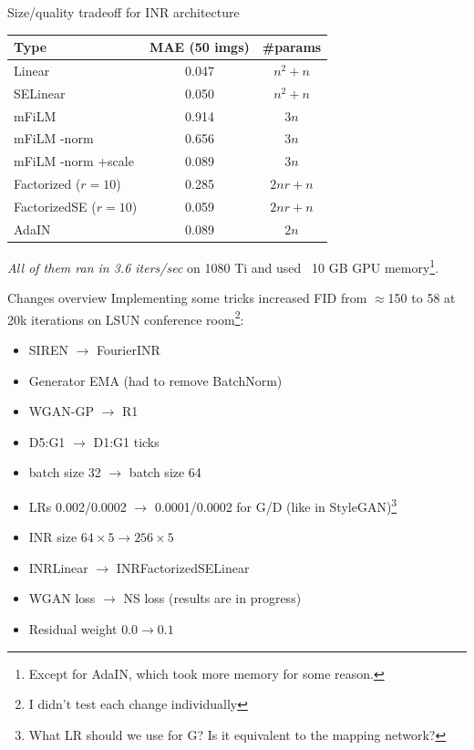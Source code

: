 \documentclass[10pt, handout]{beamer}
\begin{document}
\begin{frame}{Size/quality tradeoff for INR architecture}
\begin{table}[]
\begin{tabular}{|l|c|c|}
\hline
Type & MAE (50 imgs) & \#params \\ \hline
Linear & 0.047 & $n^2 + n$ \\
SELinear & 0.050 & $n^2 + n$ \\
mFiLM & 0.914 & $3n$ \\
mFiLM -norm & 0.656 & $3n$ \\
mFiLM -norm +scale & 0.089 & $3n$ \\
Factorized ($r=10$) & 0.285 & $2nr + n$ \\
FactorizedSE ($r=10$) & 0.059 & $2nr + n$ \\
AdaIN & 0.089 & $2n$ \\ \hline
\end{tabular}
\end{table}
\textit{All of them ran in 3.6 iters/sec} on 1080 Ti and used ~10 GB GPU memory\footnote{Except for AdaIN, which took more memory for some reason.}.
\end{frame}


\begin{frame}{Changes overview}
Implementing some tricks increased FID from $\approx$150 to 58 at 20k iterations on LSUN conference room\footnote{I didn't test each change individually}:
\begin{itemize}
    \item\pause SIREN $\to$ FourierINR
    \item\pause Generator EMA (had to remove BatchNorm)
    \item\pause WGAN-GP $\to$ R1
    \item\pause D5:G1 $\to$ D1:G1 ticks
    \item\pause batch size 32 $\to$ batch size 64 
    \item\pause LRs 0.002/0.0002 $\to$ 0.0001/0.0002 for G/D (like in StyleGAN)\footnote{What LR should we use for G? Is it equivalent to the mapping network?}
    \item\pause INR size $64 \times 5 \to 256 \times 5$
    \item\pause INRLinear $\to$ INRFactorizedSELinear
    \item\pause WGAN loss $\to$ NS loss (results are in progress)
    \item\pause Residual weight $0.0 \to 0.1$
\end{itemize}
\end{frame}
\end{document}
